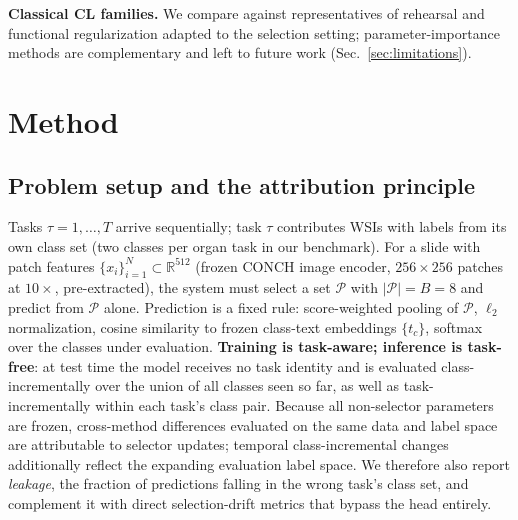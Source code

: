 \documentclass{article}
\begin{document}
\textbf{Classical CL families.} We compare against representatives of rehearsal \cite{lopezpaz2017gem,buzzega2020derpp,rebuffi2017icarl} and functional regularization \cite{li2018lwf} adapted to the selection setting; parameter-importance methods \cite{kirkpatrick2017ewc} are complementary and left to future work (Sec.~\ref{sec:limitations}).

\section{Method}
\label{sec:method}
\subsection{Problem setup and the attribution principle}
Tasks $\tau = 1,\dots,T$ arrive sequentially; task $\tau$ contributes WSIs with labels from its own class set (two classes per organ task in our benchmark). For a slide with patch features $\{x_i\}_{i=1}^{N}\!\subset\!\mathbb{R}^{512}$ (frozen CONCH image encoder, $256{\times}256$ patches at $10\times$, pre-extracted), the system must select a set $\mathcal{P}$ with $|\mathcal{P}| = B = 8$ and predict from $\mathcal{P}$ alone. Prediction is a fixed rule: score-weighted pooling of $\mathcal{P}$, $\ell_2$ normalization, cosine similarity to frozen class-text embeddings $\{t_c\}$, softmax over the classes under evaluation. \textbf{Training is task-aware; inference is task-free}: at test time the model receives no task identity and is evaluated class-incrementally over the union of all classes seen so far, as well as task-incrementally within each task's class pair. Because all non-selector parameters are frozen, cross-method differences evaluated on the same data and label space are attributable to selector updates; temporal class-incremental changes additionally reflect the expanding evaluation label space. We therefore also report \emph{leakage}, the fraction of predictions falling in the wrong task's class set, and complement it with direct selection-drift metrics that bypass the head entirely.
\end{document}
